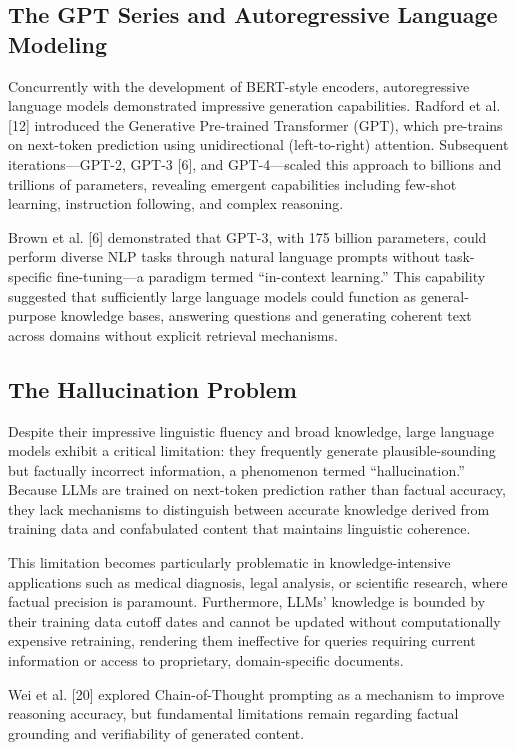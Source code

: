 \subsection{The GPT Series and Autoregressive Language Modeling}

Concurrently with the development of BERT-style encoders, autoregressive language models demonstrated impressive generation capabilities. Radford et al. [12] introduced the Generative Pre-trained Transformer (GPT), which pre-trains on next-token prediction using unidirectional (left-to-right) attention. Subsequent iterations---GPT-2, GPT-3 [6], and GPT-4---scaled this approach to billions and trillions of parameters, revealing emergent capabilities including few-shot learning, instruction following, and complex reasoning.

Brown et al. [6] demonstrated that GPT-3, with 175 billion parameters, could perform diverse NLP tasks through natural language prompts without task-specific fine-tuning---a paradigm termed ``in-context learning.'' This capability suggested that sufficiently large language models could function as general-purpose knowledge bases, answering questions and generating coherent text across domains without explicit retrieval mechanisms.

\subsection{The Hallucination Problem}

Despite their impressive linguistic fluency and broad knowledge, large language models exhibit a critical limitation: they frequently generate plausible-sounding but factually incorrect information, a phenomenon termed ``hallucination.'' Because LLMs are trained on next-token prediction rather than factual accuracy, they lack mechanisms to distinguish between accurate knowledge derived from training data and confabulated content that maintains linguistic coherence.

This limitation becomes particularly problematic in knowledge-intensive applications such as medical diagnosis, legal analysis, or scientific research, where factual precision is paramount. Furthermore, LLMs' knowledge is bounded by their training data cutoff dates and cannot be updated without computationally expensive retraining, rendering them ineffective for queries requiring current information or access to proprietary, domain-specific documents.

Wei et al. [20] explored Chain-of-Thought prompting as a mechanism to improve reasoning accuracy, but fundamental limitations remain regarding factual grounding and verifiability of generated content.

